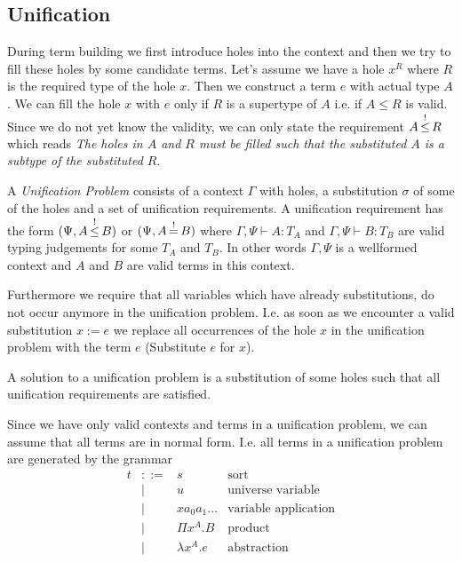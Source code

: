 \subsection{Unification}

During term building we first introduce holes into the context and then we try
to fill these holes by some candidate terms. Let's assume we have a hole $x^R$
where $R$ is the required type of the hole $x$. Then we construct a term $e$
with actual type $A$. We can fill the hole $x$ with $e$ only if $R$ is a
supertype of $A$ i.e. if $A \le R$ is valid. Since we do not yet know the
validity, we can only state the requirement $A {\,\stackrel{!}{\le}\,} R$ which reads \emph{The
holes in $A$ and $R$ must be filled such that the substituted $A$ is a subtype
of the substituted $R$}.



\begin{definition} A \emph{Unification Problem} consists of a context $\Gamma$
with holes, a substitution $\sigma$ of some of the holes and a set of
unification requirements. A unification requirement has the form $(\Psi, A
{\,\stackrel{!}{\le}\,} B)$ or $(\Psi, A {\,\stackrel{!}{=}\,} B)$ where $\Gamma,\Psi \vdash A: T_A$ and
$\Gamma,\Psi \vdash B: T_B$ are valid typing judgements for some $T_A$ and
$T_B$. In other words $\Gamma,\Psi$ is a wellformed context and $A$ and $B$ are
valid terms in this context.

Furthermore we require that all variables which have already substitutions, do
not occur anymore in the unification problem. I.e. as soon as we encounter a
valid substitution $x:=e$ we replace all occurrences of the hole $x$ in the
unification problem with the term $e$ (Substitute $e$ for $x$).

A solution to a unification problem is a substitution of some holes such that
all unification requirements are satisfied.
\end{definition}


Since we have only valid contexts and terms in a unification problem, we can
assume that all terms are in normal form. I.e. all terms in a unification
problem are generated by the grammar
$$
\begin{array}{lllll}
    t &::=&  s & \text{sort}
    \\
    &\mid&  u & \text{universe variable}
    \\
    &\mid& x a_0 a_1 \ldots & \text{variable application}
    \\
    &\mid& \Pi x^A. B       & \text{product}
    \\
    &\mid& \lambda x^A. e   & \text{abstraction}
\end{array}
$$


